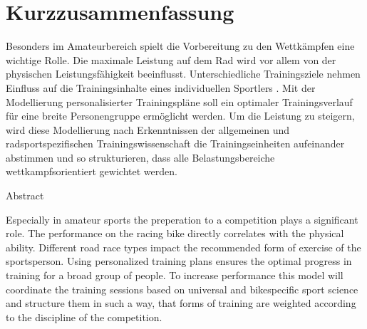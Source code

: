 \chapter*{Kurzzusammenfassung}
\label{sec:abstract}
\vspace*{-10mm}
Besonders im Amateurbereich spielt die Vorbereitung zu den Wettkämpfen eine wichtige Rolle. Die maximale Leistung auf dem Rad wird vor allem von der physischen Leistungsfähigkeit beeinflusst. Unterschiedliche Trainingsziele nehmen Einfluss auf die Trainingsinhalte eines individuellen Sportlers . Mit der Modellierung personalisierter Trainingspläne soll ein optimaler Trainingsverlauf für eine breite Personengruppe ermöglicht werden.
Um die Leistung zu steigern, wird diese Modellierung nach Erkenntnissen der allgemeinen und radsportspezifischen Trainingswissenschaft die Trainingseinheiten aufeinander abstimmen und so strukturieren, dass alle Belastungsbereiche wettkampfsorientiert gewichtet werden.
\vspace*{20mm}

{Abstract}
\label{sec:abstract-diff}

Especially in amateur sports the preperation to a competition plays a significant role. The performance on the racing bike directly correlates with the physical ability. Different road race types impact the recommended form of exercise of the sportsperson. Using personalized training plans ensures the optimal progress in training for a broad group of people.
To increase performance this model will coordinate the training sessions based on universal and bikespecific sport science and structure them in such a way, that forms of training are weighted according to the discipline of the competition.